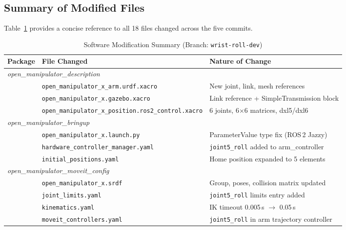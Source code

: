 \documentclass[conference]{IEEEtran}
\begin{document}
		\subsection{Summary of Modified Files}
		
		Table~\ref{tab:files} provides a concise reference to all 18 files
		changed across the five commits.
		
		\begin{table}[t]
			\centering
			\caption{Software Modification Summary (Branch: \texttt{wrist-roll-dev})}
			\label{tab:files}
			\renewcommand{\arraystretch}{1.2}
			\small
			\begin{tabular}{lll}
				\toprule
				\textbf{Package} & \textbf{File Changed} & \textbf{Nature of Change} \\
				\midrule
				\multicolumn{3}{l}{\textit{open\_manipulator\_description}} \\[2pt]
				& \texttt{open\_manipulator\_x\_arm.urdf.xacro}           & New joint, link, mesh references \\
				& \texttt{open\_manipulator\_x.gazebo.xacro}               & Link reference + SimpleTransmission block \\
				& \texttt{open\_manipulator\_x\_position.ros2\_control.xacro} & 6 joints, 6$\times$6 matrices, dxl5/dxl6 \\
				\midrule
				\multicolumn{3}{l}{\textit{open\_manipulator\_bringup}} \\[2pt]
				& \texttt{open\_manipulator\_x.launch.py}                  & ParameterValue type fix (ROS\,2 Jazzy) \\
				& \texttt{hardware\_controller\_manager.yaml}              & \texttt{joint5\_roll} added to arm\_controller \\
				& \texttt{initial\_positions.yaml}                          & Home position expanded to 5 elements \\
				\midrule
				\multicolumn{3}{l}{\textit{open\_manipulator\_moveit\_config}} \\[2pt]
				& \texttt{open\_manipulator\_x.srdf}                       & Group, poses, collision matrix updated \\
				& \texttt{joint\_limits.yaml}                               & \texttt{joint5\_roll} limits entry added \\
				& \texttt{kinematics.yaml}                                  & IK timeout 0.005\,s $\rightarrow$ 0.05\,s \\
				& \texttt{moveit\_controllers.yaml}                         & \texttt{joint5\_roll} in arm trajectory controller \\

\end{tabular}
\end{table}
\end{document}
